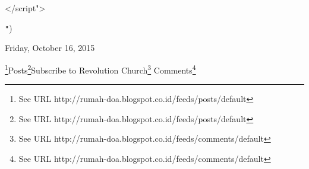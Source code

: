% 

</script">













\texttt{{}"{}})

Friday, October 16, 2015




\footnote{See URL http://rumah-doa.blogspot.co.id/feeds/posts/default}Posts\footnote{See URL http://rumah-doa.blogspot.co.id/feeds/posts/default}Subscribe to Revolution Church\footnote{See URL http://rumah-doa.blogspot.co.id/feeds/comments/default}
Comments\footnote{See URL http://rumah-doa.blogspot.co.id/feeds/comments/default}

